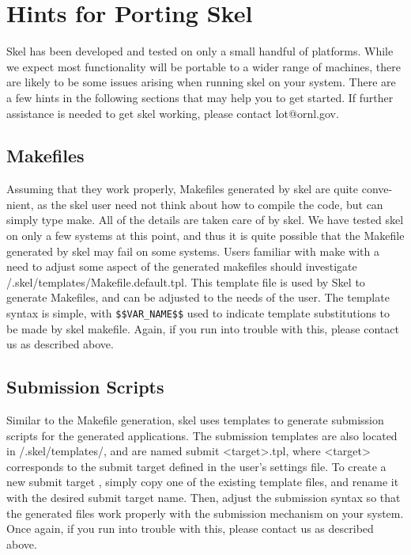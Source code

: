 
\chapter{Hints for Porting Skel}
Skel has been developed and tested on only a small handful of platforms. While
we expect most functionality will be portable to a wider range of machines,
there are likely to be some issues arising when running skel on your system.
There are a few hints in the following sections that may help you to get started.
If further assistance is needed to get skel working, please contact lot@ornl.gov.

\section{Makefiles}
Assuming that they work properly, Makefiles generated by skel are quite conve-
nient, as the skel user need not think about how to compile the code, but can
simply type make. All of the details are taken care of by skel. We have tested
skel on only a few systems at this point, and thus it is quite possible that the
Makefile generated by skel may fail on some systems. Users familiar with make
with a need to adjust some aspect of the generated makefiles should investigate
/.skel/templates/Makefile.default.tpl. This template file is used by Skel to
generate Makefiles, and can be adjusted to the needs of the user. The template
syntax is simple, with {\tt \$\$VAR\_NAME\$\$} used to indicate template substitutions
to be made by skel makefile. Again, if you run into trouble with this, please
contact us as described above.

\section{Submission Scripts}
Similar to the Makefile generation, skel uses templates to generate submission
scripts for the generated applications. The submission templates are also located
in
/.skel/templates/, and are named submit <target>.tpl, where <target>
corresponds to the submit target defined in the user's settings file. To create a
new submit target , simply copy one of the existing template files, and rename
it with the desired submit target name. Then, adjust the submission syntax
so that the generated files work properly with the submission mechanism on
your system. Once again, if you run into trouble with this, please contact us as
described above.
